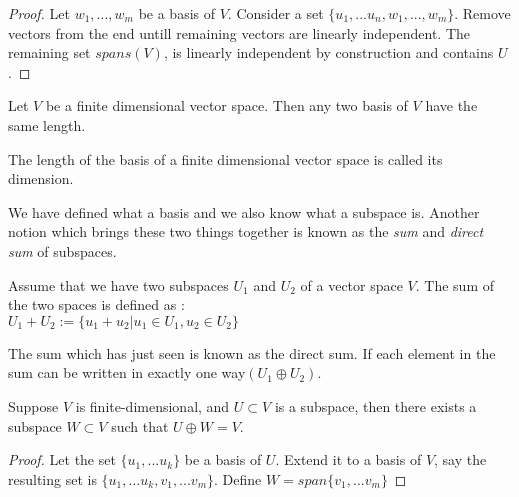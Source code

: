 \begin{proof}
	Let $w_1,...,w_m$ be a basis of $V$. Consider a set $\{u_1,...u_n,w_1,...,w_m\}$. Remove vectors from the end untill remaining vectors are linearly independent. The remaining set $spans(V)$, is linearly independent by construction and contains $U$.
\end{proof}

\begin{corollary}
	Let $V$ be a finite dimensional vector space. Then any two basis of $V$ have the same length.
\end{corollary}

\begin{definition}
	The length of the basis of a finite dimensional vector space is called its dimension. 
\end{definition}

We have defined what a basis and we also know what a subspace is. Another notion which brings these two things together is known as the \textit{sum} and \textit{direct sum} of subspaces. 

\begin{definition}
	Assume that we have two subspaces $U_1$ and $U_2$ of a vector space $V$. The sum of the two spaces is defined as : \\
	$U_1 + U_2 := \{ u_1 + u_2 | u_1 \in U_1, u_2 \in U_2 \}$
\end{definition}

The sum which has just seen is known as the direct sum. If each element in the sum can be written in exactly one way$(U_1\oplus U_2)$.

\begin{proposition}
	Suppose $V$ is finite-dimensional, and $U \subset V$ is a subspace, then there exists a subspace $W \subset V$ such that $U \oplus W =  V$.
\end{proposition}

\begin{proof}
	Let the set $\{u_1,...u_k\}$ be a basis of $U$. Extend it to a basis of $V$, say the resulting set is $\{u_1,...u_k, v_1,...v_m\}$. Define $W = span\{v_1,...v_m\}$ 
\end{proof}
